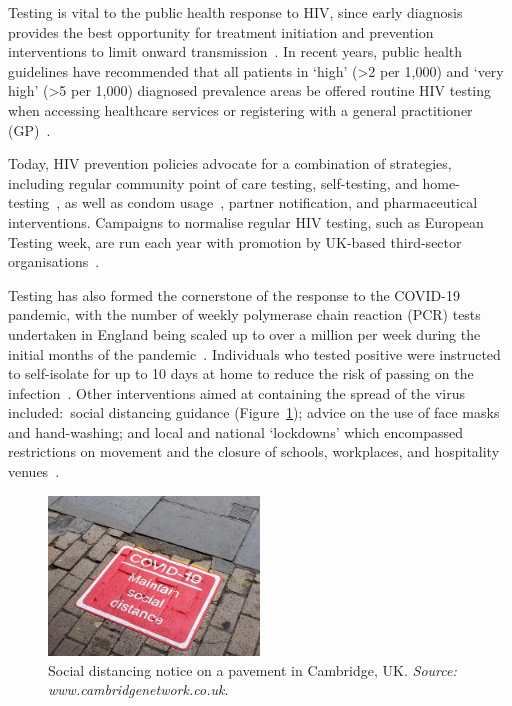 Testing is vital to the public health response to HIV, since early diagnosis provides the best opportunity for treatment initiation and prevention interventions to limit onward transmission~\parencite{Cohen2010-ol}. In recent years, public health guidelines have recommended that all patients in `high' (>2 per 1,000) and `very high' (>5 per 1,000) diagnosed prevalence areas be offered routine HIV testing when accessing healthcare services or registering with a general practitioner (GP)~\parencite{Health-Protection-Agency2011-ek, Gulland2011-fb, National_Institute_for_Health_and_Care_Excellence2016-js}.

Today, HIV prevention policies advocate for a combination of strategies, including regular community point of care testing, self-testing, and home-testing~\parencite{National_Institute_for_Health_and_Care_Excellence2016-js}, as well as condom usage~\parencite{Pebody2021-fb}, partner notification, and pharmaceutical interventions. Campaigns to normalise regular HIV testing, such as European Testing week, are run each year with promotion by UK-based third-sector organisations~\parencite{European_Testing_Week2023-ab}.

Testing has also formed the cornerstone of the response to the COVID-19 pandemic, with the number of weekly polymerase chain reaction (PCR) tests undertaken in England being scaled up to over a million per week during the initial months of the pandemic~\parencite{UK_Government2021-ip}. Individuals who tested positive were instructed to self-isolate for up to 10 days at home to reduce the risk of passing on the infection~\parencite{UK-Health-Security-Agency2022-lu}. Other interventions aimed at containing the spread of the virus included:\ social distancing guidance (Figure~\ref{fig:covid-distancing}); advice on the use of face masks and hand-washing; and local and national `lockdowns' which encompassed restrictions on movement and the closure of schools, workplaces, and hospitality venues~\parencite{Knock2021-ba}.

\begin{figure}[htbp!]
  \centering
  \includegraphics[width=0.5\textwidth]{covid-distancing.jpg}
  \caption[Social distancing notice on a pavement in Cambridge, UK]{Social distancing notice on a pavement in Cambridge, UK\@. \textit{Source: www.cambridgenetwork.co.uk}.}\label{fig:covid-distancing}
\end{figure}

